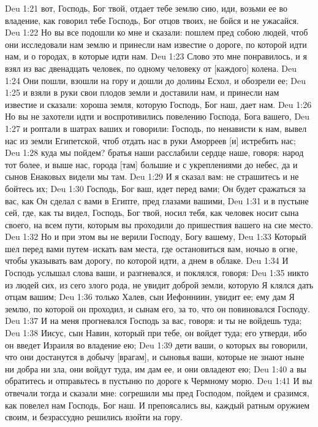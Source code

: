 Deu 1:21  вот, Господь, Бог твой, отдает тебе землю сию, иди, возьми ее во владение, как говорил тебе Господь, Бог отцов твоих, не бойся и не ужасайся.
Deu 1:22  Но вы все подошли ко мне и сказали: пошлем пред собою людей, чтоб они исследовали нам землю и принесли нам известие о дороге, по которой идти нам, и о городах, в которые идти нам.
Deu 1:23  Слово это мне понравилось, и я взял из вас двенадцать человек, по одному человеку от [каждого] колена.
Deu 1:24  Они пошли, взошли на гору и дошли до долины Есхол, и обозрели ее;
Deu 1:25  и взяли в руки свои плодов земли и доставили нам, и принесли нам известие и сказали: хороша земля, которую Господь, Бог наш, дает нам.
Deu 1:26  Но вы не захотели идти и воспротивились повелению Господа, Бога вашего,
Deu 1:27  и роптали в шатрах ваших и говорили: Господь, по ненависти к нам, вывел нас из земли Египетской, чтоб отдать нас в руки Аморреев [и] истребить нас;
Deu 1:28  куда мы пойдем? братья наши расслабили сердце наше, говоря: народ тот более, и выше нас, города [там] большие и с укреплениями до небес, да и сынов Енаковых видели мы там.
Deu 1:29  И я сказал вам: не страшитесь и не бойтесь их;
Deu 1:30  Господь, Бог ваш, идет перед вами; Он будет сражаться за вас, как Он сделал с вами в Египте, пред глазами вашими,
Deu 1:31  и в пустыне сей, где, как ты видел, Господь, Бог твой, носил тебя, как человек носит сына своего, на всем пути, которым вы проходили до пришествия вашего на сие место.
Deu 1:32  Но и при этом вы не верили Господу, Богу вашему,
Deu 1:33  Который шел перед вами путем--искать вам места, где остановиться вам, ночью в огне, чтобы указывать вам дорогу, по которой идти, а днем в облаке.
Deu 1:34  И Господь услышал слова ваши, и разгневался, и поклялся, говоря:
Deu 1:35  никто из людей сих, из сего злого рода, не увидит доброй земли, которую Я клялся дать отцам вашим;
Deu 1:36  только Халев, сын Иефонниин, увидит ее; ему дам Я землю, по которой он проходил, и сынам его, за то, что он повиновался Господу.
Deu 1:37  И на меня прогневался Господь за вас, говоря: и ты не войдешь туда;
Deu 1:38  Иисус, сын Навин, который при тебе, он войдет туда; его утверди, ибо он введет Израиля во владение ею;
Deu 1:39  дети ваши, о которых вы говорили, что они достанутся в добычу [врагам], и сыновья ваши, которые не знают ныне ни добра ни зла, они войдут туда, им дам ее, и они овладеют ею;
Deu 1:40  а вы обратитесь и отправьтесь в пустыню по дороге к Чермному морю.
Deu 1:41  И вы отвечали тогда и сказали мне: согрешили мы пред Господом, пойдем и сразимся, как повелел нам Господь, Бог наш. И препоясались вы, каждый ратным оружием своим, и безрассудно решились взойти на гору.
